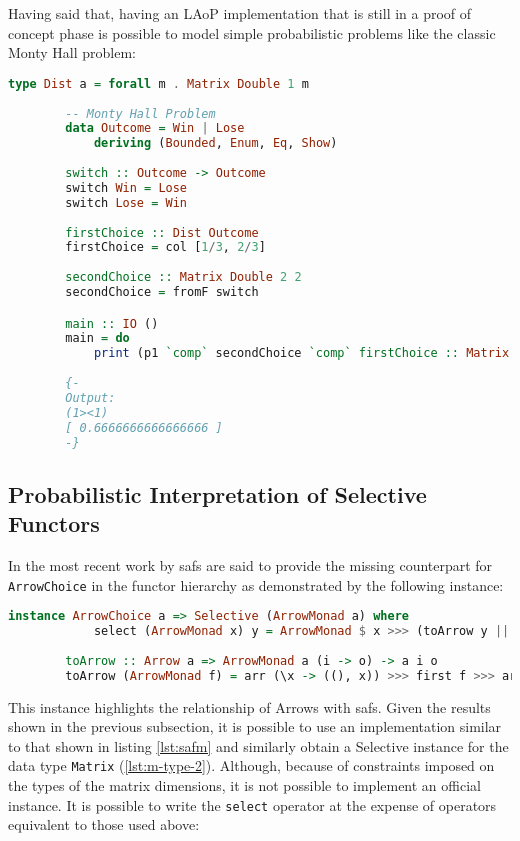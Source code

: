 \documentclass[
  oneside,
  11pt, a4paper,
  footinclude=true,
  headinclude=true,
  cleardoublepage=empty
]{scrbook}
\theoremstyle{definition}
\theoremstyle{definition}
\begin{document}
        Having said that, having an LAoP implementation that is still in a proof of concept phase is possible to model simple probabilistic problems like the classic Monty Hall problem:
        
        \begin{lstlisting}[language=Haskell, caption={LAoP Monty Hall Problem},captionpos=b]
        type Dist a = forall m . Matrix Double 1 m
        
        -- Monty Hall Problem
        data Outcome = Win | Lose
            deriving (Bounded, Enum, Eq, Show)
        
        switch :: Outcome -> Outcome
        switch Win = Lose
        switch Lose = Win
        
        firstChoice :: Dist Outcome
        firstChoice = col [1/3, 2/3]
        
        secondChoice :: Matrix Double 2 2
        secondChoice = fromF switch 

        main :: IO ()
        main = do 
            print (p1 `comp` secondChoice `comp` firstChoice :: Matrix Double 1 1)
            
        {- 
        Output:
        (1><1)
        [ 0.6666666666666666 ]
        -}
        \end{lstlisting}{}
        
        \subsection{Probabilistic Interpretation of Selective Functors}
        
        In the most recent work by \cite{andrey2019selective} \gls{saf}s are said to provide the missing counterpart for \texttt{ArrowChoice} in the functor hierarchy as demonstrated by the following instance:
        
        \begin{lstlisting}[language=Haskell, label={lst:safm}, caption={Selective ArrowMonad instance},captionpos=b]
        instance ArrowChoice a => Selective (ArrowMonad a) where
            select (ArrowMonad x) y = ArrowMonad $ x >>> (toArrow y ||| returnA)
            
        toArrow :: Arrow a => ArrowMonad a (i -> o) -> a i o
        toArrow (ArrowMonad f) = arr (\x -> ((), x)) >>> first f >>> arr (uncurry ($))
        \end{lstlisting}{}
	    
	    This instance highlights the relationship of Arrows with \gls{saf}s. Given the results shown in the previous subsection, it is possible to use an implementation similar to that shown in listing \ref{lst:safm} and similarly obtain a Selective instance for the data type \texttt{Matrix} (\ref{lst:m-type-2}). Although, because of constraints imposed on the types of the matrix dimensions, it is not possible to implement an official instance. It is possible to write the \texttt{select} operator at the expense of operators equivalent to those used above:
	    
\end{document}
